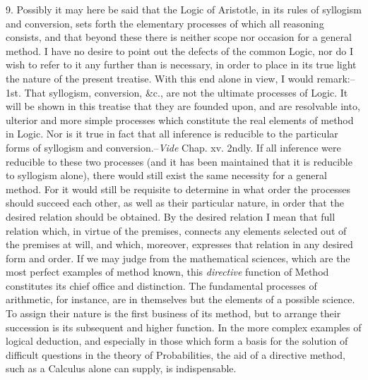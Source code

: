 \documentclass[oneside]{book}
\begin{document}
9. Possibly it may here be said that the Logic of Aristotle,
in its rules of syllogism and conversion, sets forth the elementary
processes of which all reasoning consists, and that beyond these
there is neither scope nor occasion for a general method. I have
no desire to point out the defects of the common Logic, nor do I
wish to refer to it any further than is necessary, in order to place
in its true light the nature of the present treatise. With this
end alone in view, I would remark:--1st. That syllogism, conversion,
\&c., are not the ultimate processes of Logic. It will
be shown in this treatise that they are founded upon, and are resolvable
into, ulterior and more simple processes which constitute
the real elements of method in Logic. Nor is it true in fact that
all inference is reducible to the particular forms of syllogism and
conversion.--\textit{Vide} Chap. xv. 2ndly. If all inference were reducible
to these two processes (and it has been maintained that
it is reducible to syllogism alone), there would still exist the
same necessity for a general method. For it would still be requisite
to determine in what order the processes should succeed
each other, as well as their particular nature, in order that the
desired relation should be obtained. By the desired relation I
mean that full relation which, in virtue of the premises, connects
any elements selected out of the premises at will, and which,
moreover, expresses that relation in any desired form and order.
If we may judge from the mathematical sciences, which are the
most perfect examples of method known, this \textit{directive} function
of Method constitutes its chief office and distinction. The fundamental
processes of arithmetic, for instance, are in themselves
but the elements of a possible science. To assign their nature is
the first business of its method, but to arrange their succession
is its subsequent and higher function. In the more complex
examples of logical deduction, and especially in those which form
a basis for the solution of difficult questions in the theory of
Probabilities, the aid of a directive method, such as a Calculus
alone can supply, is indispensable.
\end{document}
